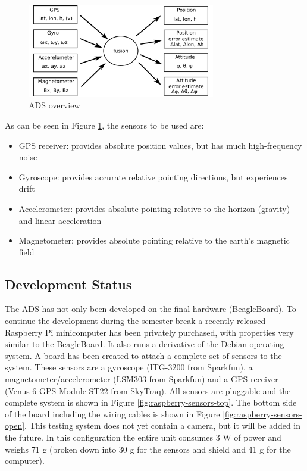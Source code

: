 \begin{figure}
\centering
\includegraphics[width=0.73\textwidth]{figures/ADS_diagram.pdf}
\caption{\acl{ADS} overview}
\label{fig:ADS_overview}
\end{figure}

\noindent
As can be seen in Figure \ref{fig:ADS_overview}, the sensors to be used are:

\begin{itemize}
\item \ac{GPS} receiver: provides absolute position values, but has much high-frequency noise
\item Gyroscope: provides accurate relative pointing directions, but experiences drift
\item Accelerometer: provides absolute pointing relative to the horizon (gravity) and linear acceleration
\item Magnetometer: provides absolute pointing relative to the earth's magnetic field
\end{itemize}

\subsection{Development Status}

The \ac{ADS} has not only been developed on the final hardware (BeagleBoard). To continue the development during the semester break a recently released Raspberry Pi minicomputer \cite{website:raspberry} has been privately purchased, with properties very similar to the BeagleBoard. It also runs a derivative of the Debian operating system. A board has been created to attach a complete set of sensors to the system. These sensors are a gyroscope (ITG-3200 from Sparkfun), a magnetometer/accelerometer (LSM303 from Sparkfun) and a \ac{GPS} receiver (Venus 6 \ac{GPS} Module ST22 from SkyTraq). All sensors are pluggable and the complete system is shown in Figure \ref{fig:raspberry-sensors-top}. The bottom side of the board including the wiring cables is shown in Figure \ref{fig:raspberry-sensors-open}. This testing system does not yet contain a camera, but it will be added in the future. In this configuration the entire unit consumes 3 W of power and weighs 71 g (broken down into 30 g for the sensors and shield and 41 g for the computer).

